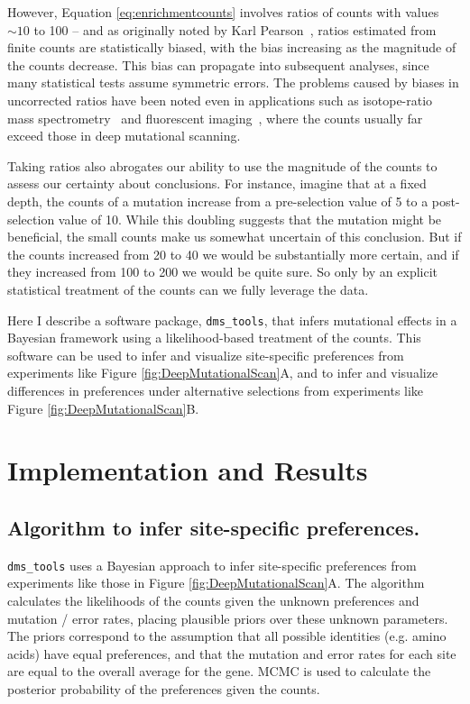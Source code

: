 \documentclass[twocolumn]{bmcart}%
\begin{document}
However, Equation \ref{eq:enrichmentcounts} involves ratios of counts with values $\sim 10$ to 100 -- and as originally noted by Karl Pearson~\cite{pearson1896mathematical,pearson1910}, ratios estimated from finite counts are statistically biased, with the bias increasing as the magnitude of the counts decrease. This bias can propagate into subsequent analyses, since many statistical tests assume symmetric errors. The problems caused by biases in uncorrected ratios have been noted even in applications such as isotope-ratio mass spectrometry~\cite{ogliore2011} and fluorescent imaging~\cite{van2000mean}, where the counts usually far exceed those in deep mutational scanning.

Taking ratios also abrogates our ability to use the magnitude of the counts to assess our certainty about conclusions. For instance, imagine that at a fixed depth, the counts of a mutation increase from a pre-selection value of 5 to a post-selection value of 10. While this doubling suggests that the mutation might be beneficial, the small counts make us somewhat uncertain of this conclusion. But if the counts increased from 20 to 40 we would be substantially more certain, and if they increased from 100 to 200 we would be quite sure. So only by an explicit statistical treatment of the counts can we fully leverage the data.

Here I describe a software package, \texttt{dms\_tools}, that infers mutational effects in a Bayesian framework using a likelihood-based treatment of the counts. This software can be used to infer and visualize site-specific preferences from experiments like Figure \ref{fig:DeepMutationalScan}A, and to infer and visualize differences in preferences under alternative selections from experiments like Figure \ref{fig:DeepMutationalScan}B. 

\section*{Implementation and Results}

\subsection*{Algorithm to infer site-specific preferences.}
\texttt{dms\_tools} uses a Bayesian approach to infer site-specific preferences from experiments like those in Figure \ref{fig:DeepMutationalScan}A. The algorithm calculates the likelihoods of the counts given the unknown preferences and mutation / error rates, placing plausible priors over these unknown parameters. The priors correspond to the assumption that all possible identities (e.g. amino acids) have equal preferences, and that the mutation and error rates for each site are equal to the overall average for the gene. MCMC is used to calculate the posterior probability of the preferences given the counts.
\end{document}
